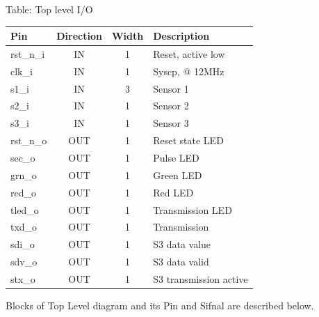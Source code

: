 \documentclass[12pt,a4 paper] {report}
\begin{document}
 Table: Top level I/O \\
\begin{center}
	\begin{tabular}{ | p{2cm} | c | c | p{5cm} |}
		\hline
		\textbf{Pin} & \textbf{Direction} & \textbf{Width} & \textbf{Description} \\
		\hline
		rst\_n\_i & IN & 1 & Reset, active low \\
		\hline
		clk\_i & IN & 1 & Syscp, @ 12MHz \\
		\hline
		s1\_i & IN & 3 & Sensor 1 \\
		\hline
		s2\_i & IN & 1 & Sensor 2 \\
		\hline
		s3\_i & IN & 1 & Sensor 3 \\
		\hline
		rst\_n\_o & OUT & 1 & Reset state LED \\
		\hline
		sec\_o & OUT & 1 & Pulse LED \\
		\hline
		grn\_o & OUT & 1 & Green LED \\
		\hline
		red\_o & OUT & 1 & Red LED\\
		\hline
		tled\_o & OUT & 1 & Transmission LED \\
		\hline
		txd\_o & OUT & 1 & Transmission \\
		\hline
		sdi\_o & OUT & 1 & S3 data value \\
		\hline
		sdv\_o & OUT & 1 & S3 data valid \\
		\hline
		stx\_o & OUT & 1 & S3 transmission active \\
		\hline
	\end{tabular}
\end{center}

\newpage

Blocks of Top Level diagram and its Pin and Sifnal are described below. 
\end{document}
